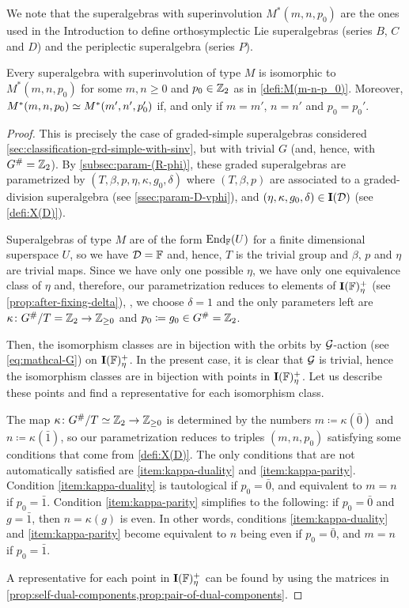 We note that the superalgebras with superinvolution $M^*(m,n,p_0)$ are the ones used in the Introduction to define orthosymplectic Lie superalgebras (series $B$, $C$ and $D$) and the periplectic superalgebra (series $P$).

\begin{prop}\label{prop:iso-M-with-vphi}
    Every superalgebra with superinvolution of type $M$ is isomorphic to $M^*(m,n, p_0)$ for some $m,n \geq 0$ and $p_0 \in \mathbb{Z}_2$ as in \cref{defi:M(m-n-p_0)}. 
    Moreover, $M^*(m,n, p_0) \simeq M^*(m',n', p_0')$ if, and only if $m = m'$, $n = n'$ and $p_0 = p_0'$.
\end{prop}

\begin{proof}
    This is precisely the case of graded-simple superalgebras considered \cref{sec:classification-grd-simple-with-sinv}, but with trivial $G$ (and, hence, with $G^\# = \mathbb{Z}_2$). 
    By \cref{subsec:param-(R-phi)}, these graded superalgebras are parametrized by $(T, \beta, p, \eta, \kappa, g_0, \delta)$ where $(T, \beta, p)$ are associated to a graded-division superalgebra (see \cref{ssec:param-D-vphi}), and $(\eta, \kappa, g_0, \delta) \in \mathbf{I}(\mathcal{D})$ (see \cref{defi:X(D)}). 
    
    Superalgebras of type $M$ are of the form $\operatorname{End}_{\mathbb{F}} (U)$ for a finite dimensional superspace $U$, so we have $\mathcal{D} = \mathbb{F}$ and, hence, $T$ is the trivial group and $\beta$, $p$ and $\eta$ are trivial maps. 
    Since we have only one possible $\eta$, we have only one equivalence class of $\eta$ and, therefore, our parametrization reduces to elements of $\mathbf{I}(\mathbb{F})_\eta^+$ (see \cref{prop:after-fixing-delta}), \ie, we choose $\delta = 1$ and the only parameters left are $\kappa\colon G^\#/T = \mathbb{Z}_2 \to \mathbb{Z}_{\geq 0}$ and $p_0 \coloneqq g_0 \in G^\# = \mathbb{Z}_2$. 
    
    Then, the isomorphism classes are in bijection with the orbits by $\mathcal G$-action (see \cref{eq:mathcal-G}) on $\mathbf{I}(\mathbb{F})_\eta^+$. 
    In the present case, it is clear that $\mathcal G$ is trivial, hence the isomorphism classes are in bijection with points in $\mathbf{I}(\mathbb{F})_\eta^+$. 
    Let us describe these points and find a representative for each isomorphism class. 
    
    The map $\kappa\colon G^\#/T \simeq \mathbb{Z}_2 \to \mathbb{Z}_{\geq 0}$ is determined by the numbers $m \coloneqq \kappa(\bar 0)$ and $n \coloneqq \kappa(\bar 1)$, so our parametrization reduces to triples $(m,n,p_0)$ satisfying some conditions that come from \cref{defi:X(D)}. 
    The only conditions that are not automatically satisfied are \eqref{item:kappa-duality} and \eqref{item:kappa-parity}. 
    Condition \eqref{item:kappa-duality} is tautological if $p_0 = \bar 0$, and equivalent to $m=n$ if $p_0 = \bar 1$. 
    Condition \eqref{item:kappa-parity} simplifies to the following: if $p_0 = \bar 0$ and $g = \bar 1$, then $n = \kappa (g)$ is even. 
    In other words, conditions \eqref{item:kappa-duality} and \eqref{item:kappa-parity} become equivalent to $n$ being even if $p_0 = \bar 0$, and $m = n$ if $p_0= \bar 1$. 
    
    A representative for each point in $\mathbf{I}(\mathbb{F})_\eta^+$ can be found by using the matrices in \cref{prop:self-dual-components,prop:pair-of-dual-components}. 
\end{proof}